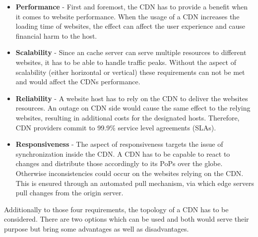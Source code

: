 \begin{itemize}
	\item \textbf{Performance} - First and foremost, the CDN has to provide a benefit when it comes to website performance. When the usage of a CDN increases the loading time of websites, the effect can affect the user experience and cause financial harm to the host.\cite{cdn_general}
	\item \textbf{Scalability} - Since an cache server can serve multiple resources to different websites, it has to be able to handle traffic peaks. Without the aspect of scalability (either horizontal or vertical) these requirements can not be met and would affect the CDNs performance.
	\item \textbf{Reliability} -  A website host has to rely on the CDN to deliver the websites resources. An outage on CDN side would cause the same effect to the relying websites, resulting in additional costs for the designated hosts. Therefore, CDN providers commit to 99.9\% service level agreements (SLAs).
	\item \textbf{Responsiveness} -  The aspect of responsiveness targets the issue of synchronization inside the CDN. A CDN has to be capable to react to changes and distribute those accordingly to its PoPs over the globe. Otherwise inconsistencies could occur on the websites relying on the CDN. This is ensured through an automated pull mechanism, via which edge servers pull changes from the origin server.\cite{cdn_origin_server}
\end{itemize}

Additionally to those four requirements, the topology of a CDN has to be considered. There are two options which can be used and both would serve their purpose but bring some advantages as well as disadvantages. 

